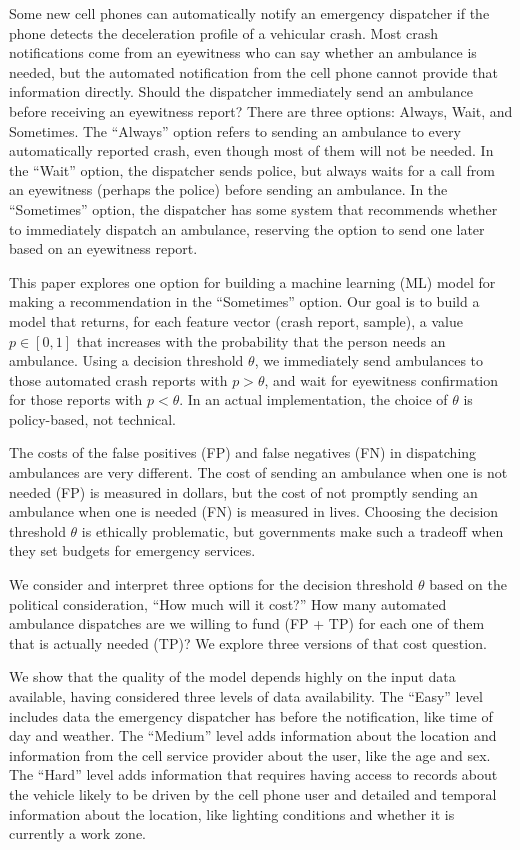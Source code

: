 Some new cell phones can automatically notify an emergency dispatcher if the phone detects the deceleration profile of a vehicular crash.  Most crash notifications come from an eyewitness who can say whether an ambulance is needed, but the automated notification from the cell phone cannot provide that information directly.  Should the dispatcher immediately send an ambulance before receiving an eyewitness report?  There are three options: Always, Wait, and Sometimes.  The ``Always'' option refers to sending an ambulance to every automatically reported crash, even though most of them will not be needed.  In the ``Wait'' option, the dispatcher sends police, but always waits for a call from an eyewitness (perhaps the police) before sending an ambulance.  In the ``Sometimes'' option, the dispatcher has some system that recommends whether to immediately dispatch an ambulance, reserving the option to send one later based on an eyewitness report.


This paper explores one option for building a machine learning (ML) model for making a recommendation in the ``Sometimes'' option.    Our goal is to build a model that returns, for each feature vector (crash report, sample), a value $p \in [0,1]$ that increases with the probability that the person needs an ambulance.  Using a decision threshold $\theta$, we immediately send ambulances to those automated crash reports with $p > \theta$, and wait for eyewitness confirmation for those reports with $p < \theta$. In an actual implementation, the choice of $\theta$ is policy-based, not technical.

The costs of the false positives (FP) and false negatives (FN) in dispatching ambulances are very different.  The cost of sending an ambulance when one is not needed (FP) is measured in dollars, but the cost of not promptly sending an ambulance when one is needed (FN) is measured in lives.  Choosing the decision threshold $\theta$ is ethically problematic, but governments make such a tradeoff when they set budgets for emergency services.  

We consider and interpret three options for the decision threshold $\theta$ based on the political consideration, ``How much will it cost?''  How many automated ambulance dispatches are we willing to fund (FP + TP) for each one of them that is actually needed (TP)?  We explore three versions of that cost question.  

We show that the quality of the model depends highly on the input data available, having considered three levels of data availability.  The ``Easy'' level includes data the emergency dispatcher has before the notification, like time of day and weather.  The ``Medium'' level adds information about the location and information from the cell service provider about the user, like the age and sex.  The ``Hard'' level adds information that requires having access to records about the vehicle likely to be driven by the cell phone user and detailed and temporal information about the location, like lighting conditions and whether it is currently a work zone.  

